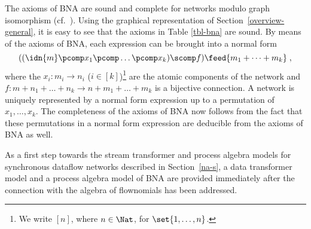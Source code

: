 \documentclass[fleqn]{llncs}
\begin{document}
The axioms of BNA are sound and complete for networks modulo graph
isomorphism (cf.~\cite{Ste86}).
Using the graphical representation of Section~\ref{overview-general},
it is easy to see that the axioms in Table \ref{tbl-bna} are sound.
By means of the axioms of BNA, each expression can be brought into a
normal form
$$
((\idn{m} \pcomp x_1 \pcomp \dots \pcomp x_k) \scomp f)
                                        \feed{m_1 + \dots + m_k}\;,
$$
where the $x_i : m_i \to n_i$ ($i \in [k]$)\footnote{We write $[n]$, where $n \in \Nat$, for $\set{1,\ldots,n}$.}
are the atomic components of the network and
$f : m + n_1 + \dots + n_k \to n + m_1 + \dots + m_k$ is a bijective
connection.
A network is uniquely represented by a normal form expression up to a
permutation of $x_1,\ldots,x_k$.
The completeness of the axioms of BNA now follows from the fact that
these permutations in a normal form expression are deducible from the
axioms of BNA as well.

As a first step towards the stream transformer and process algebra
models for synchronous dataflow networks described in 
Section~\ref{na-s}, a data transformer model and a process algebra 
model of BNA are provided immediately after the connection with the 
algebra of flownomials has been addressed.
\end{document}
